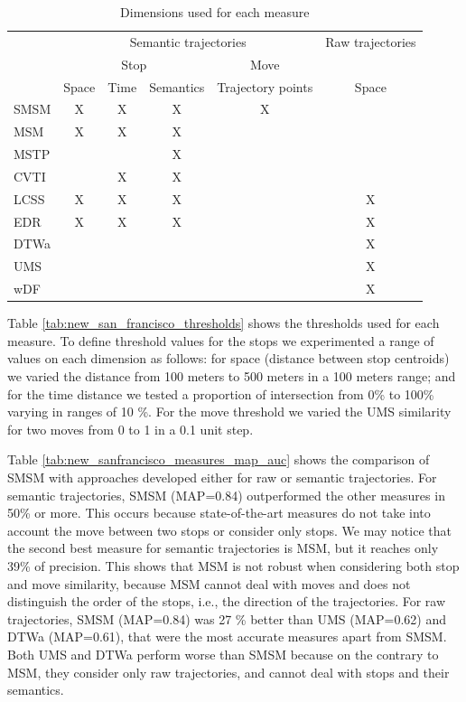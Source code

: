 \begin{table}[!h]
\scriptsize
  \centering
  \begin{tabular}{|l|c|c|c|c|c|}
  \hline
  & \multicolumn{4}{c|}{Semantic trajectories} & \multicolumn{1}{c|}{Raw trajectories} \\
 	\cline{2-5}
  & \multicolumn{3}{c|}{Stop} & \multicolumn{1}{c|}{Move} & \multicolumn{1}{c|}{} \\
 	\cline{2-6}
  & Space & Time & Semantics & Trajectory points & Space\\
  \hline
 SMSM & X & X & X & X & \\
 MSM & X & X & X & &\\
 MSTP &  &  & X & & \\
 CVTI & & X & X & & \\
 LCSS & X & X & X & & X \\
 EDR & X & X & X & & X \\
 DTWa &  &  &  & & X \\
 UMS & & & & & X \\
 wDF & & & & & X \\
    \hline
  \end{tabular}
  \caption{Dimensions used for each measure}
  \label{tab:new_san_francisco_measures}
\end{table}

{Table {\ref{tab:new_san_francisco_thresholds}} shows the  thresholds used for each measure. To define threshold values for the stops we experimented  a range of values on each dimension as follows: for space (distance between stop centroids) we varied the distance from 100 meters to 500 meters in a 100 meters range; and for the time distance we tested a proportion of intersection from 0\% to 100\% varying in ranges of 10 \%. For the move threshold we varied the UMS similarity for two moves from 0 to 1 in a 0.1 unit step.

Table {\ref{tab:new_sanfrancisco_measures_map_auc}} shows the comparison of SMSM with approaches developed either for raw or semantic trajectories.
For semantic trajectories, SMSM (MAP=0.84) outperformed the other measures in 50\% or more. This occurs because state-of-the-art measures do not take into account the move between two stops or consider only stops. We may notice that the second best measure for semantic trajectories is MSM, but it reaches only 39\% of precision. This shows that MSM is not robust when considering both stop and move similarity, because MSM cannot deal with moves and does not distinguish the order of the stops, i.e., the direction of the trajectories. 
For raw trajectories, SMSM (MAP=0.84) was 27 \% better than UMS (MAP=0.62) and DTWa (MAP=0.61), that were the most accurate measures apart from SMSM. Both UMS and DTWa perform worse than SMSM because on the contrary to MSM, they consider only raw trajectories, and cannot deal with stops and their semantics.}

